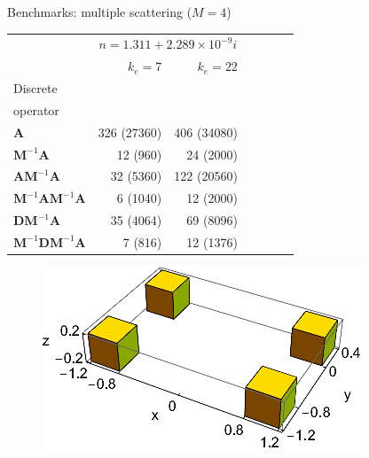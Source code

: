 \documentclass[12pt]{beamer}
\begin{document}
\begin{frame}{Benchmarks: multiple scattering ($M=4$)}
\begin{footnotesize}
\begin{table}
\centering
\begin{tabular}{lrrrrrr}
\toprule
& \multicolumn{2}{c}{$n=1.311 + 2.289 \times 10^{-9}i$}  \\
\cmidrule{2-3} 
 & $k_e =7$   & $k_e =22$ \\
\midrule
Discrete    &   &  & \\
operator & & & \\
$\mathbf{A}$  &326 (27360)  &406 (34080)  \\
$\mathbf{M}^{-1} \mathbf{A}$  &12 (960)  &24 (2000)\\
$\mathbf{A}\mathbf{M}^{-1} \mathbf{A}$   &32 (5360)   &122 (20560) \\
$\mathbf{M}^{-1} \mathbf{A}\mathbf{M}^{-1} \mathbf{A}$  &6 (1040)  &12 (2000) \\
$\mathbf{D}\mathbf{M}^{-1} \mathbf{A}$   &35 (4064)   &69 (8096) \\
$\mathbf{M}^{-1} \mathbf{D}\mathbf{M}^{-1} \mathbf{A}$  &7 (816)  &12 (1376)  \\
\bottomrule
\end{tabular}
\end{table}
\end{footnotesize}

\begin{figure}
    \hfill
    \includegraphics[width = 0.4 \textwidth]{Figures/4cubes.png}
\end{figure}
\end{frame}
\end{document}
